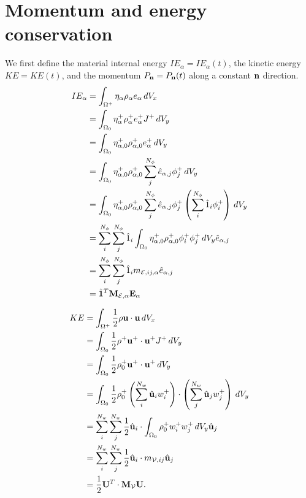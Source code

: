 \documentclass[11pt]{report}
\begin{document}
\section{Momentum and energy conservation}
We first define the material internal energy $IE_\alpha=IE_\alpha(t)$, the kinetic energy $KE=KE(t)$, and the momentum $P_{\mathbf{n}}=P_{\mathbf{n}}(t)$ along a constant $\mathbf{n}$ direction.
\begin{align}
    IE_\alpha &= \int_{\Omega^+} \eta_\alpha \rho_\alpha e_\alpha \, dV_x \nonumber \\
    &= \int_{\Omega_0} \eta^+_\alpha \rho^+_\alpha e^+_\alpha J^+ \, dV_y \nonumber \\
    &= \int_{\Omega_0} \eta^+_{\alpha,0} \rho^+_{\alpha,0} e^+_\alpha \, dV_y \nonumber \\
    &= \int_{\Omega_0} \eta^+_{\alpha,0} \rho_{\alpha,0}^+ \sum_{j}^{N_\phi} \hat{e}_{\alpha,j} \phi_j^+ \, dV_y \nonumber \\
    &= \int_{\Omega_0} \eta^+_{\alpha,0}  \rho_{\alpha,0}^+ \sum_{j}^{N_\phi} \hat{e}_{\alpha,j} \phi_j^+ \left ( \sum_{i}^{N_\phi} \hat{1}_i \phi^+_i \right ) \, dV_y \nonumber \\
    &= \sum_i^{N_\phi} \sum_j^{N_\phi} \hat{1}_i \int_{\Omega_0} \eta^+_{\alpha,0}  \rho_{\alpha,0}^+ \phi_i^+ \phi_j^+ \, dV_y \hat{e}_{\alpha,j} \nonumber \\
    &= \sum_i^{N_\phi} \sum_j^{N_\phi} \hat{1}_i m_{\mathcal{E},ij,\alpha} \hat{e}_{\alpha,j} \nonumber \\
    &= \hat{\mathbf{1}}^T \mathbf{M}_{\mathcal{E},\alpha} \mathbf{E}_\alpha 
\end{align}

\begin{align}
    KE &= \int_{\Omega^+} \frac{1}{2} \rho \mathbf{u} \cdot \mathbf{u} \, dV_x \nonumber \\
    &= \int_{\Omega_0} \frac{1}{2} \rho^+ \mathbf{u}^+ \cdot \mathbf{u}^+ J^+ \, dV_y \nonumber \\
    &= \int_{\Omega_0} \frac{1}{2} \rho_0^+ \mathbf{u}^+ \cdot \mathbf{u}^+ \, dV_y \nonumber \\
    &= \int_{\Omega_0} \frac{1}{2} \rho_0^+ \left ( \sum_i^{N_w} \hat{\mathbf{u}}_i w_i^+ \right ) \cdot \left ( \sum_j^{N_w} \hat{\mathbf{u}}_j w_j^+ \right ) \, dV_y \nonumber \\
    &= \sum_i^{N_w} \sum_j^{N_w} \frac{1}{2} \hat{\mathbf{u}}_i \cdot \int_{\Omega_0}\rho_0^+ w_i^+ w_j^+ \, dV_y \hat{\mathbf{u}}_j \nonumber \\
    &= \sum_i^{N_w} \sum_j^{N_w} \frac{1}{2} \hat{\mathbf{u}}_i \cdot m_{\mathcal{V},ij} \hat{\mathbf{u}}_j \nonumber \\
    &= \frac{1}{2} \mathbf{U}^T \cdot \mathbf{M}_\mathcal{V} \mathbf{U}.
\end{align}
\end{document}
